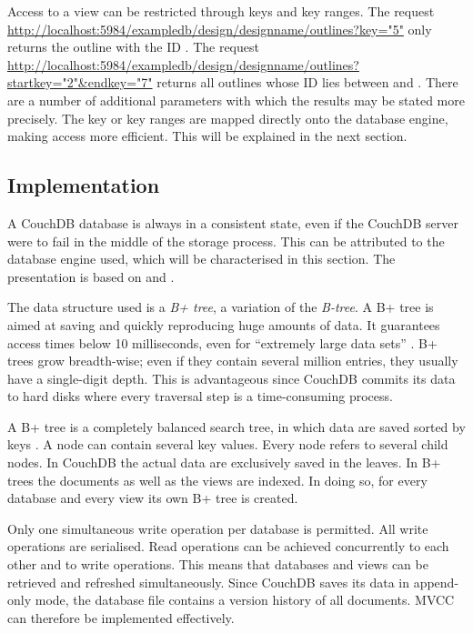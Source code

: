 Access to a view can be restricted through keys and key ranges. The request {\url{http://localhost:5984/exampledb/design/designname/outlines?key="5"}} only returns the outline with the ID {}. The request {\url{http://localhost:5984/exampledb/design/designname/outlines?startkey="2"&endkey="7"}} returns all outlines whose ID lies between {} and {}. There are a number of additional parameters with which the results may be stated more precisely. The key or key ranges are mapped directly onto the database engine, making access more efficient. This will be explained in the next section.


\subsection{Implementation}
\label{subsec:implementierung}

A CouchDB database is always in a consistent state, even if the CouchDB server were to fail in the middle of the storage process. This can be attributed to the database engine used, which will be characterised in this section. The presentation is based on \cite{btree:couchdb-implementation} and .

The data structure used is a \textit{B+ tree}, a variation of the \textit{B-tree}. A B+ tree is aimed at saving and quickly reproducing huge amounts of data. It guarantees access times below 10 milliseconds, even for \enquote{extremely large data sets} . B+ trees grow breadth-wise; even if they contain several million entries, they usually have a single-digit depth. This is advantageous since CouchDB commits its data to hard disks where every traversal step is a time-consuming process.

A B+ tree is a completely balanced search tree, in which data are saved sorted by keys . A node can contain several key values. Every node refers to several child nodes. In CouchDB the actual data are exclusively saved in the leaves. In B+ trees the documents as well as the views are indexed. In doing so, for every database and every view its own B+ tree is created.

Only one simultaneous write operation per database is permitted. All write operations are serialised. Read operations can be achieved concurrently to each other and to write operations. This means that databases and views can be retrieved and refreshed simultaneously. Since CouchDB saves its data in append-only mode, the database file contains a version history of all documents. MVCC can therefore be implemented effectively.

